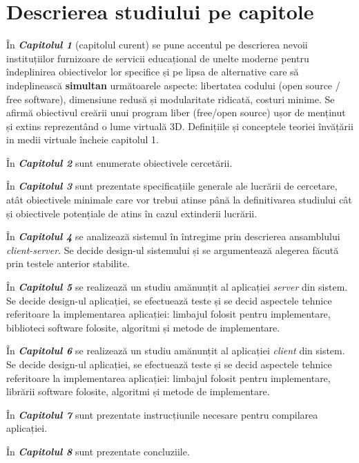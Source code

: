 \section{Descrierea studiului pe capitole}
\par În \textbf{\textit{Capitolul 1}} (capitolul curent) se pune accentul pe descrierea nevoii instituțiilor furnizoare de servicii educațional de unelte moderne pentru îndeplinirea obiectivelor lor specifice și pe lipsa de alternative care să indeplinească  \textbf{simultan} următoarele aspecte: libertatea codului (open source / free software), dimensiune redusă și modularitate ridicată, costuri minime. Se afirmă obiectivul creării unui program liber (free/open source) ușor de menținut și extins reprezentând o lume virtuală 3D. Definițiile și conceptele teoriei învățării in medii virtuale încheie capitolul 1.
\par În \textbf{\textit{Capitolul 2}} sunt enumerate obiectivele cercetării.
\par În \textbf{\textit{Capitolul 3}} sunt prezentate specificațiile generale ale lucrării de cercetare, atât obiectivele minimale care vor trebui atinse până la definitivarea studiului cât și obiectivele potențiale de atins în cazul extinderii lucrării.
\par În \textbf{\textit{Capitolul 4}} se analizează sistemul în întregime prin descrierea ansamblului \textit{client-server}. Se decide design-ul  sistemului și se argumentează alegerea făcută prin testele anterior stabilite.
\par În \textbf{\textit{Capitolul 5}} se realizează un studiu amănunțit al aplicației \textit{server} din sistem. Se decide design-ul aplicației, se efectuează teste și se decid aspectele tehnice referitoare la implementarea aplicației: limbajul folosit pentru implementare, biblioteci software folosite, algoritmi și metode de implementare.
\par În \textbf{\textit{Capitolul 6}} se realizează un studiu amănunțit al aplicației \textit{client} din sistem. Se decide design-ul aplicației, se efectuează teste și se decid aspectele tehnice referitoare la implementarea aplicației: limbajul folosit pentru implementare, librării software folosite, algoritmi și metode de implementare.
\par În \textbf{\textit{Capitolul 7}} sunt prezentate instrucțiunile necesare pentru compilarea aplicației. 
\par În \textbf{\textit{Capitolul 8}} sunt prezentate concluziile. 
